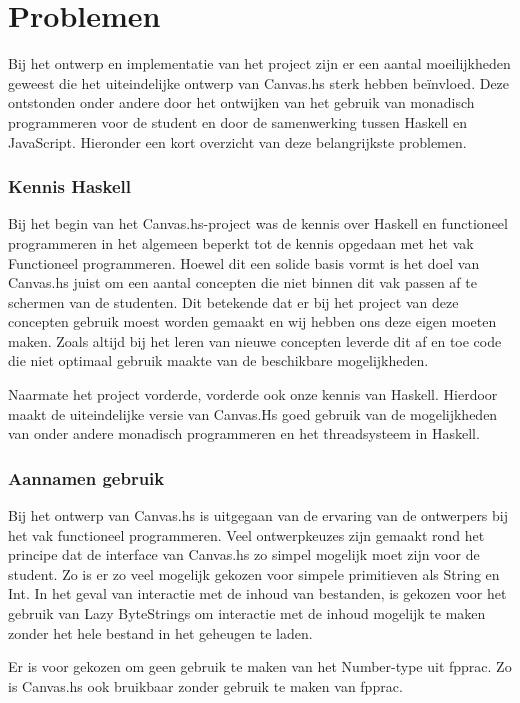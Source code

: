 \section{Problemen}

Bij het ontwerp en implementatie van het project zijn er een aantal moeilijkheden geweest die het uiteindelijke ontwerp van Canvas.hs sterk hebben beïnvloed. Deze ontstonden onder andere door het ontwijken van het gebruik van monadisch programmeren voor de student en door de samenwerking tussen Haskell en JavaScript. Hieronder een kort overzicht van deze belangrijkste problemen.

\subsubsection{Kennis Haskell}
Bij het begin van het Canvas.hs-project was de kennis over Haskell en functioneel programmeren in het algemeen beperkt tot de kennis opgedaan met het vak Functioneel programmeren. Hoewel dit een solide basis vormt is het doel van Canvas.hs juist om een aantal concepten die niet binnen dit vak passen af te schermen van de studenten. Dit betekende dat er bij het project van deze concepten gebruik moest worden gemaakt en wij hebben ons deze eigen moeten maken. Zoals altijd bij het leren van nieuwe concepten leverde dit af en toe code die niet optimaal gebruik maakte van de beschikbare mogelijkheden.

Naarmate het project vorderde, vorderde ook onze kennis van Haskell. Hierdoor maakt de uiteindelijke versie van Canvas.Hs goed gebruik van de mogelijkheden van onder andere monadisch programmeren en het threadsysteem in Haskell. 

\subsubsection{Aannamen gebruik}
Bij het ontwerp van Canvas.hs is uitgegaan van de ervaring van de ontwerpers bij het vak functioneel programmeren. Veel ontwerpkeuzes zijn gemaakt rond het principe dat de interface van Canvas.hs zo simpel mogelijk moet zijn voor de student. Zo is er zo veel mogelijk gekozen voor simpele primitieven als String en Int. In het geval van interactie met de inhoud van bestanden, is gekozen voor het gebruik van Lazy ByteStrings om interactie met de inhoud mogelijk te maken zonder het hele bestand in het geheugen te laden.

Er is voor gekozen om geen gebruik te maken van het Number-type uit fpprac. Zo is Canvas.hs ook bruikbaar zonder gebruik te maken van fpprac.

